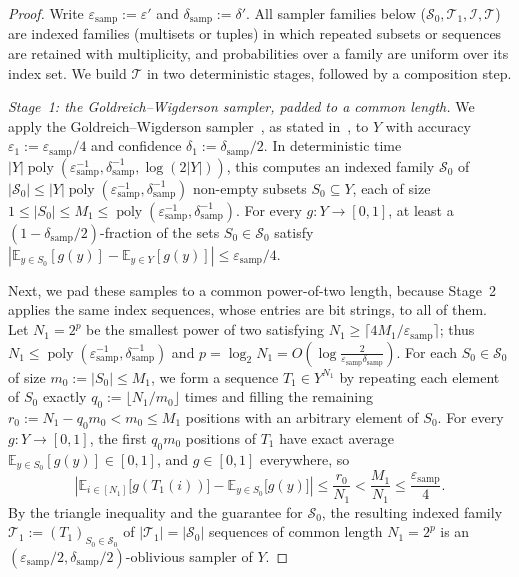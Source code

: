 \documentclass[11pt]{article}
\theoremstyle{definition}
\newcommand{\E}{\mathbb{E}}
\newcommand{\poly}{\operatorname{poly}}
\newcommand{\abs}[1]{\left\lvert #1 \right\rvert}
\begin{document}
\begin{proof}
Write $\varepsilon_{\text{samp}} := \varepsilon'$ and $\delta_{\text{samp}} := \delta'$. All sampler families below ($\mathcal{S}_0, \mathcal{T}_1, \mathcal{I}, \mathcal{T}$) are indexed families (multisets or tuples) in which repeated subsets or sequences are retained with multiplicity, and probabilities over a family are uniform over its index set. We build $\mathcal{T}$ in two deterministic stages, followed by a composition step.

\emph{Stage~1: the Goldreich--Wigderson sampler, padded to a common length.} We apply the Goldreich--Wigderson sampler~\cite{GoldreichW97}, as stated in~\cite[Lemma~4.4]{AFKLM24}, to $Y$ with accuracy $\varepsilon_1 := \varepsilon_{\text{samp}}/4$ and confidence $\delta_1 := \delta_{\text{samp}}/2$. In deterministic time $\abs{Y}\poly(\varepsilon_{\text{samp}}^{-1}, \delta_{\text{samp}}^{-1}, \log(2\abs{Y}))$, this computes an indexed family $\mathcal{S}_0$ of $\abs{\mathcal{S}_0} \le \abs{Y}\poly(\varepsilon_{\text{samp}}^{-1}, \delta_{\text{samp}}^{-1})$ non-empty subsets $S_0 \subseteq Y$, each of size $1 \le \abs{S_0} \le M_1 \le \poly(\varepsilon_{\text{samp}}^{-1}, \delta_{\text{samp}}^{-1})$. For every $g : Y \to [0, 1]$, at least a $(1 - \delta_{\text{samp}}/2)$-fraction of the sets $S_0 \in \mathcal{S}_0$ satisfy $\abs{\E_{y \in S_0}[g(y)] - \E_{y \in Y}[g(y)]} \le \varepsilon_{\text{samp}}/4$.

Next, we pad these samples to a common power-of-two length, because Stage~2 applies the same index sequences, whose entries are bit strings, to all of them. Let $N_1 = 2^p$ be the smallest power of two satisfying $N_1 \ge \lceil 4 M_1 / \varepsilon_{\text{samp}} \rceil$; thus $N_1 \le \poly(\varepsilon_{\text{samp}}^{-1}, \delta_{\text{samp}}^{-1})$ and $p = \log_2 N_1 = O(\log\frac{2}{\varepsilon_{\text{samp}}\delta_{\text{samp}}})$. For each $S_0 \in \mathcal{S}_0$ of size $m_0 := \abs{S_0} \le M_1$, we form a sequence $T_1 \in Y^{N_1}$ by repeating each element of $S_0$ exactly $q_0 := \lfloor N_1 / m_0 \rfloor$ times and filling the remaining $r_0 := N_1 - q_0 m_0 < m_0 \le M_1$ positions with an arbitrary element of $S_0$. For every $g : Y \to [0, 1]$, the first $q_0 m_0$ positions of $T_1$ have exact average $\E_{y \in S_0}[g(y)] \in [0, 1]$, and $g \in [0, 1]$ everywhere, so
\[
    \abs{\E_{i \in [N_1]}\big[g(T_1(i))\big] - \E_{y \in S_0}\big[g(y)\big]} \le \frac{r_0}{N_1} < \frac{M_1}{N_1} \le \frac{\varepsilon_{\text{samp}}}{4}.
\]
By the triangle inequality and the guarantee for $\mathcal{S}_0$, the resulting indexed family $\mathcal{T}_1 := (T_1)_{S_0 \in \mathcal{S}_0}$ of $\abs{\mathcal{T}_1} = \abs{\mathcal{S}_0}$ sequences of common length $N_1 = 2^p$ is an $(\varepsilon_{\text{samp}}/2, \delta_{\text{samp}}/2)$-oblivious sampler of $Y$.


\end{proof}
\end{document}
